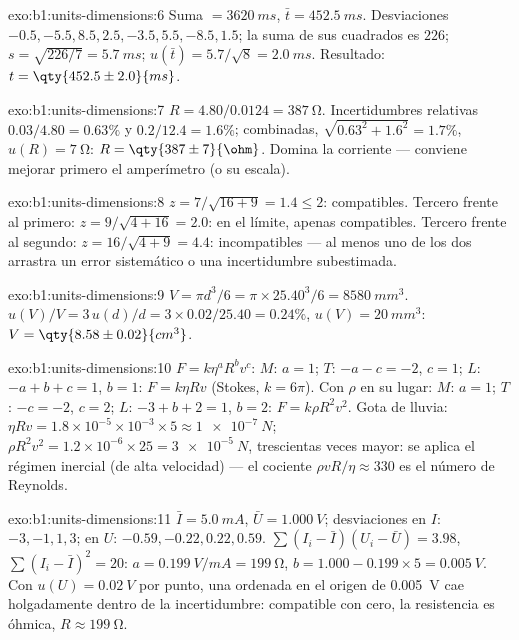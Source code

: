 \begin{solution}{exo:b1:units-dimensions:6}
Suma $= \qty{3620}{ms}$, $\bar t = \qty{452.5}{ms}$. Desviaciones
$-0.5, -5.5, 8.5, 2.5, -3.5, 5.5, -8.5, 1.5$; la suma de sus cuadrados es $226$;
$s = \sqrt{226/7} = \qty{5.7}{ms}$; $u(\bar t) = 5.7/\sqrt8 = \qty{2.0}{ms}$.
Resultado: $t = \qty{452.5\pm2.0}{ms}$.
\end{solution}

\begin{solution}{exo:b1:units-dimensions:7}
$R = 4.80/0.0124 = \qty{387}{\ohm}$. Incertidumbres relativas $0.03/4.80 =
0.63\%$ y $0.2/12.4 = 1.6\%$; combinadas, $\sqrt{0.63^2 + 1.6^2} = 1.7\%$,
$u(R) = \qty{7}{\ohm}$: $R = \qty{387\pm7}{\ohm}$. Domina la corriente
--- conviene mejorar primero el amperímetro (o su escala).
\end{solution}

\begin{solution}{exo:b1:units-dimensions:8}
$z = 7/\sqrt{16 + 9} = 1.4 \leq 2$: compatibles.
Tercero frente al primero: $z = 9/\sqrt{4 + 16} = 2.0$: en el límite,
apenas compatibles. Tercero frente al segundo: $z = 16/\sqrt{4 + 9} = 4.4$:
incompatibles --- al menos uno de los dos arrastra un error sistemático
o una incertidumbre subestimada.
\end{solution}

\begin{solution}{exo:b1:units-dimensions:9}
$V = \pi d^3/6 = \pi \times 25.40^3/6 = \qty{8580}{mm^3}$.
$u(V)/V = 3\,u(d)/d = 3 \times 0.02/25.40 = 0.24\%$,
$u(V) = \qty{20}{mm^3}$: $V = \qty{8.58\pm0.02}{cm^3}$.
\end{solution}

\begin{solution}{exo:b1:units-dimensions:10}
$F = k\eta^a R^b v^c$: $M$: $a = 1$; $T$: $-a - c = -2$, $c = 1$;
$L$: $-a + b + c = 1$, $b = 1$: $F = k\eta R v$ (Stokes, $k = 6\pi$).
Con $\rho$ en su lugar: $M$: $a = 1$; $T$: $-c = -2$, $c = 2$; $L$:
$-3 + b + 2 = 1$, $b = 2$: $F = k\rho R^2 v^2$.
Gota de lluvia: $\eta R v = 1.8\times10^{-5} \times 10^{-3} \times 5 \approx
\qty{1e-7}{N}$; $\rho R^2 v^2 = 1.2 \times 10^{-6} \times 25 =
\qty{3e-5}{N}$, trescientas veces mayor: se aplica el régimen inercial
(de alta velocidad) --- el cociente $\rho v R/\eta \approx 330$ es el
número de Reynolds.
\end{solution}

\begin{solution}{exo:b1:units-dimensions:11}
$\bar I = \qty{5.0}{mA}$, $\bar U = \qty{1.000}{V}$; desviaciones en $I$:
$-3, -1, 1, 3$; en $U$: $-0.59, -0.22, 0.22, 0.59$.
$\sum (I_i - \bar I)(U_i - \bar U) = 3.98$, $\sum (I_i - \bar I)^2 = 20$:
$a = \qty{0.199}{V/mA} = \qty{199}{\ohm}$, $b = 1.000 - 0.199 \times 5 =
\qty{0.005}{V}$. Con $u(U) = \qty{0.02}{V}$ por punto, una ordenada en el
origen de \qty{0.005}{V} cae holgadamente dentro de la incertidumbre:
compatible con cero, la resistencia es óhmica, $R \approx \qty{199}{\ohm}$.
\end{solution}

